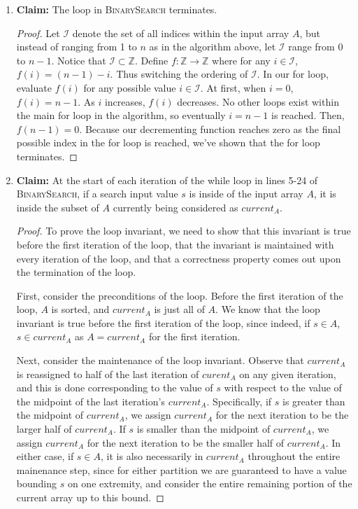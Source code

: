 \documentclass{article}
\begin{document}
\begin{enumerate}
\begin{algorithm}
\begin{algorithmic}[1]
                \end{algorithmic}
                \end{algorithm}
	\item 
		\textbf{Claim:} The loop in \textsc{BinarySearch} terminates.
		\begin{proof}
			Let $\mathcal{I}$ denote the set of all indices within the input array $A$, but instead of
			ranging from 1 to $n$ as in the algorithm above, let $\mathcal{I}$ range from 0 to $n-1$. Notice that
			$\mathcal{I} \subset \mathbb{Z}$. Define $f:\mathbb{Z}\to\mathbb{Z}$ where for any $i \in \mathcal{I}$,
			$f(i) = (n-1)-i$. Thus switching the ordering of $\mathcal{I}$. In our for loop, evaluate $f(i)$ for any
			possible value $i \in \mathcal{I}$. At first, when $i=0$, $f(i) = n - 1$. As $i$ increases, $f(i)$ 
			decreases. No other loops exist within the main for loop in the algorithm, so eventually $i = n-1$ is reached.
			Then, $f(n-1) = 0$. Because our decrementing function reaches zero as the final possible index in the
			for loop is reached, we've shown that the for loop terminates.
		\end{proof}
	\item
		\textbf{Claim:} At the start of each iteration of the while loop in lines 5-24 of \textsc{BinarySearch}, if a search input value
		$s$ is inside of the input array $A$, it is inside the subset of $A$ currently being considered as $current_A$.
		\begin{proof}
			To prove the loop invariant, we need to show that this invariant is true before the first iteration of the loop, that
			the invariant is maintained with every iteration of the loop, and that a correctness property comes out upon the
			termination of the loop.

			First, consider the preconditions of the loop. Before the first iteration of the loop, $A$ is sorted, and $current_A$ 
			is just all of $A$. We know that the loop invariant is true before the first iteration of the loop, since indeed, if
			$s \in A$, $s \in current_A$ as $A=current_A$ for the first iteration.

			Next, consider the maintenance of the loop invariant. Observe that $current_A$ is reassigned to half of the last iteration
			of $curent_A$ on any given iteration, and this is done corresponding to the value of $s$ with respect to the value of the
			midpoint of the last iteration's $current_A$. Specifically, if $s$ is greater than the midpoint of $current_A$, we assign
			$current_A$ for the next iteration to be the larger half of $current_A$. If $s$ is smaller than the midpoint of $current_A$,
			we assign $current_A$ for the next iteration to be the smaller half of $current_A$. In either case, if $s \in A$, it is also
			necessarily in $current_A$ throughout the entire mainenance step, since for either partition we are guaranteed to have a value
			bounding $s$ on one extremity, and consider the entire remaining portion of the current array up to this bound.


\end{proof}
\end{enumerate}
\end{document}
